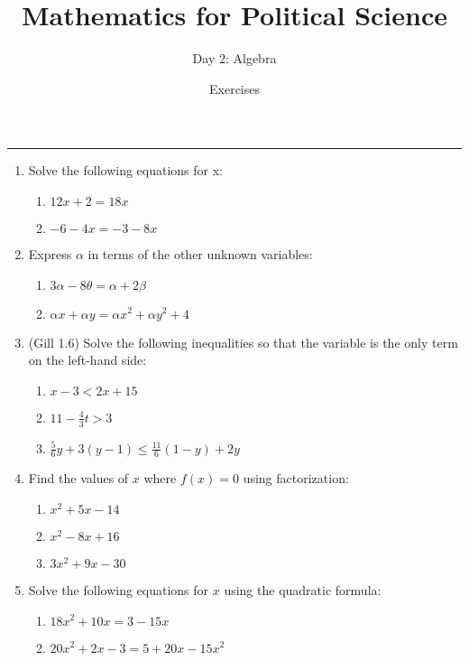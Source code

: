 \documentclass[11pt]{article}
\title{\Large{\bf{\vspace{-100pt}Mathematics for Political Science \vspace{-15pt}}}}
\author{\large{Day 2: Algebra}}
\date{\vspace{-5pt}\large{Exercises \vspace{-10pt}}}
\begin{document}
\maketitle

\hrule



\begin{enumerate}

\item Solve the following equations for x:
\begin{enumerate}
\item $12x + 2 = 18x$ %
\item $-6 - 4x = -3 - 8x$  %
\end{enumerate}


\item Express $\alpha$ in terms of the other unknown variables:
\begin{enumerate}
\item $3\alpha - 8\theta = \alpha + 2\beta$ %
\item $\alpha x + \alpha y = \alpha x^2 + \alpha y^2 + 4$ %
\end{enumerate}


\item (Gill 1.6) Solve the following inequalities so that the variable is the only term on the left-hand side:
\begin{enumerate}
\item $x - 3 < 2x + 15$  %
\item $11 - \frac{4}{3}t > 3$  %
\item $\frac{5}{6}y + 3(y-1) \leq \frac{11}{6}(1-y) + 2y$  %
\end{enumerate}


\item Find the values of $x$ where $f(x)=0$ using factorization:
\begin{enumerate}
\item $x^2 + 5x - 14$ %
\item $x^2 - 8x + 16$ %
\item $3x^2 + 9x - 30$ %
\end{enumerate}


\item Solve the following equations for $x$ using the quadratic formula:
\begin{enumerate}
\item $18x^2 + 10x = 3 - 15x$ %
\item $20x^2 + 2x - 3 = 5 + 20x - 15x^2$ %
\end{enumerate}



\end{enumerate}
\end{document}
